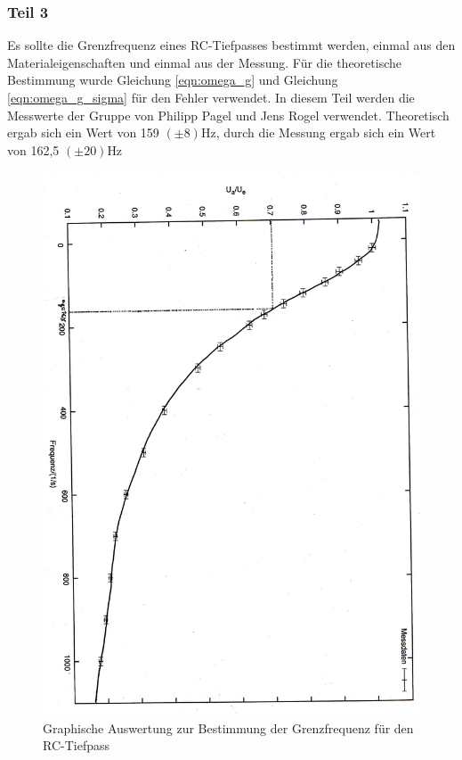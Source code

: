\documentclass[12pt]{scrartcl}
\begin{document}
\subsubsection{Teil 3}
Es sollte die Grenzfrequenz eines RC-Tiefpasses bestimmt werden, einmal aus den Materialeigenschaften und einmal aus der Messung. Für die theoretische Bestimmung wurde Gleichung \ref{eqn:omega_g} und Gleichung \ref{eqn:omega_g_sigma} für den Fehler verwendet.
In diesem Teil werden die Messwerte der Gruppe von Philipp Pagel und Jens Rogel verwendet.
Theoretisch ergab sich ein Wert von 159 $(\pm 8)$Hz, durch die Messung ergab sich ein Wert von 162,5 $(\pm 20)$Hz 

\begin{figure}[htbp] 
  \centering
    \includegraphics[scale = 0.5, angle = 90]{teil_3.pdf}
  	\caption[Graphische Auswertung zur Bestimmung der Grenzfrequenz für den RC-Tiefpass]{Graphische Auswertung zur Bestimmung der Grenzfrequenz für den RC-Tiefpass}
  \label{fig:Hochpass}
\end{figure}
\end{document}
